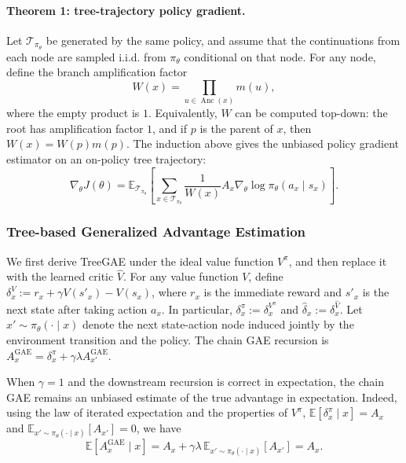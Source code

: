 \paragraph{Theorem 1: tree-trajectory policy gradient.}
Let $\mathcal{T}_{\pi_\theta}$ be generated by the same policy, and assume that the continuations from each node are sampled i.i.d. from $\pi_\theta$ conditional on that node. For any node, define the branch amplification factor
\begin{equation}
\label{eq:branch-amplification}
W(x)=\prod_{u\in\operatorname{Anc}(x)}m(u),
\end{equation}
where the empty product is $1$. Equivalently, $W$ can be computed top-down: the root has amplification factor $1$, and if $p$ is the parent of $x$, then $W(x)=W(p)m(p)$. The induction above gives the unbiased policy gradient estimator on an on-policy tree trajectory:
\begin{equation}
\label{eq:tree-policy-gradient}
\nabla_\theta J(\theta)
=
\mathbb{E}_{\mathcal{T}_{\pi_\theta}}
\left[
\sum_{x\in\mathcal{T}_{\pi_\theta}}
\frac{1}{W(x)}
A_x\nabla_\theta\log\pi_\theta(a_x\mid s_x)
\right].
\end{equation}

\subsubsection{Tree-based Generalized Advantage Estimation}

We first derive TreeGAE under the ideal value function $V^\pi$, and then replace it with the learned critic $\hat V$. For any value function $V$, define $\delta^V_x:=r_x+\gamma V(s'_x)-V(s_x)$, where $r_x$ is the immediate reward and $s'_x$ is the next state after taking action $a_x$. In particular, $\delta^\pi_x:=\delta^{V^\pi}_x$ and $\hat\delta_x:=\delta^{\hat V}_x$. Let $x'\sim\pi_\theta(\cdot\mid x)$ denote the next state-action node induced jointly by the environment transition and the policy. The chain GAE recursion is $A^{\mathrm{GAE}}_x=\delta^\pi_x+\gamma\lambda A^{\mathrm{GAE}}_{x'}$.

When $\gamma=1$ and the downstream recursion is correct in expectation, the chain GAE remains an unbiased estimate of the true advantage in expectation. Indeed, using the law of iterated expectation and the properties of $V^\pi$,
$\mathbb{E}[\delta^\pi_x\mid x]=A_x$ and
$\mathbb{E}_{x'\sim\pi_\theta(\cdot\mid x)}[A_{x'}]=0$, we have
\[
\mathbb{E}[A^{\mathrm{GAE}}_x\mid x]
=
A_x+\gamma\lambda\,
\mathbb{E}_{x'\sim\pi_\theta(\cdot\mid x)}[A_{x'}]
=
A_x.
\]

